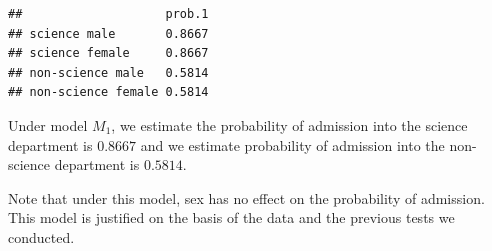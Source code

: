 \documentclass[
  11pt,
]{article}
\begin{document}
\begin{verbatim}
##                    prob.1
## science male       0.8667
## science female     0.8667
## non-science male   0.5814
## non-science female 0.5814
\end{verbatim}

Under model \(M_1\), we estimate the probability of admission into the
science department is \(0.8667\) and we estimate probability of
admission into the non-science department is \(0.5814\).

Note that under this model, sex has no effect on the probability of
admission. This model is justified on the basis of the data and the
previous tests we conducted.
\end{document}

